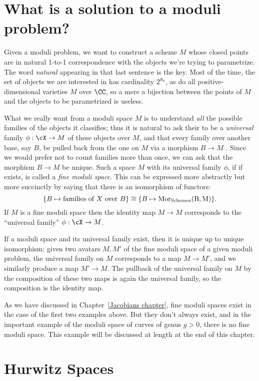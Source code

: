 \section{What is a solution to a moduli problem?}

Given a moduli problem, we want to construct a scheme $M$ whose closed points are in natural  1-to-1 correspondence with the objects we're trying to parametrize. The word \emph{natural} appearing in that last sentence is the key. Most of the time, the set of objects we are interested in has cardinality $2^{\aleph_0}$, as do all positive-dimensional varieties $M$ over $\CC$, so a mere a bijection between the points of $M$ and the objects to be parametrized is useless.

What we really want from a moduli space $M$ is to understand \emph{all} the possible families of the objects it classifies; thus it is natural to ask their to be a \emph{universal} family $\phi: \cX\to M$ of these objects over $M$,
and that every family over another base, say $B$,  be pulled back from the one on $M$ via a morphism $B\to M$ . Since we would prefer not to count families more than once, we can ask that the 
morphism $B\to M$ be unique. Such a space $M$ with its universal family $\phi$, if if exists, is called a \emph{fine moduli space}. This can be expressed more abstractly but more succinctly by saying that there is an isomorphism of functors:
$$
\{ B \mapsto \text{families of } X \text{ over } B \} \cong \{ B\mapsto \rm{Mor}_{\rm Schemes}(B, M) \}.
$$
If $M$ is a fine moduli space then the identity map $M\to M$ corresponds to the ``universal family'' $\phi: \cX \to M$. 

If a moduli space and its universal family exist, then it is unique up to unique isomorphism: given two avatars $M,M'$ of the fine moduli space of a given moduli problem,
the universal family on $M$ corresponds to a map $M\to M'$, and we similarly produce a map $M'\to M$. The pullback of the universal family on $M$ by the composition of these two maps is again the universal family, so the composition is the identity map.

As we have discussed in Chapter~\ref{Jacobians chapter}, fine moduli spaces exist in the case
of the first two examples above. But they don't always exist, and in the important example
of the moduli space of curves of genus $g>0$, there is no fine moduli space.  This example
will be discussed at length at the end of this chapter.


\section{Hurwitz Spaces}

